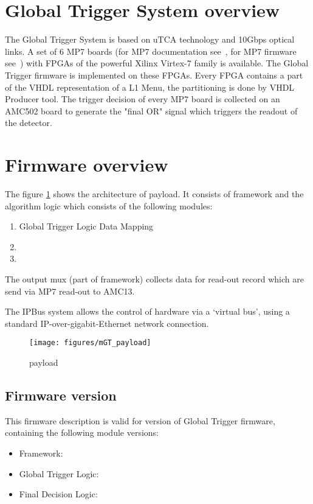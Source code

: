 \section{Global Trigger System overview}\label{sec:fw:gt_system}

The Global Trigger System is based on uTCA technology and 10Gbps optical links. A set of 6 MP7 boards (for MP7 documentation see~\cite{MP7}, for MP7 firmware see~\cite{MP7 firmware}) with FPGAs of the powerful Xilinx Virtex-7 family is available. The Global Trigger firmware is implemented on these FPGAs. Every FPGA contains a part of the VHDL representation of a L1 Menu, the partitioning is done by VHDL Producer tool. The trigger decision of every MP7 board is collected on an AMC502 board to generate the "final OR" signal which triggers the readout of the detector.

\section{Firmware overview}\label{sec:fw:fw}
The figure \ref{fig:mgt} shows the architecture of \ugt payload. It consists of framework and the algorithm logic which consists of the following modules:
\begin{enumerate}
\item Global Trigger Logic Data Mapping
\item \ugtl
\item \ufdl
\end{enumerate}

The output mux (part of framework) collects data for read-out record which are send via MP7 read-out to AMC13.

The IPBus system allows the control of hardware via a ‘virtual bus’, using a standard IP-over-gigabit-Ethernet network connection.
\begin{figure}[h!]
   \centering
    \texttt{[image: figures/mGT\_payload]}
    \caption{\ugt payload}\label{fig:mgt}
 \end{figure}

\subsection{Firmware version}\label{sec:fw:fw_version}

This firmware description is valid for version \versiongt of Global Trigger firmware, containing the following module versions:
\begin{itemize}
\item Framework: \versionframe
\item Global Trigger Logic: \versiongtl
\item Final Decision Logic: \versionfdl
\end{itemize}

